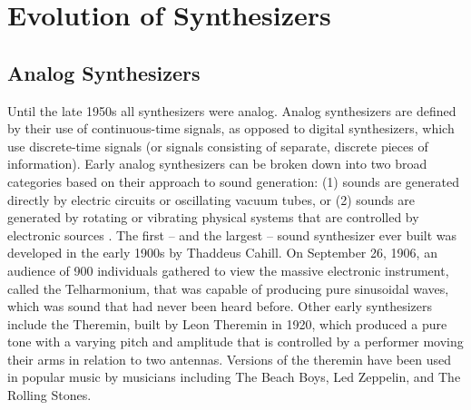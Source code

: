 \section{Evolution of Synthesizers}
\label{section:synth-history}
\subsection{Analog Synthesizers}
Until the late 1950s all synthesizers were analog. Analog synthesizers are defined by their use of continuous-time signals, as opposed to digital synthesizers, which use discrete-time signals (or signals consisting of separate, discrete pieces of information). Early analog synthesizers can be broken down into two broad categories based on their approach to sound generation: (1) sounds are generated directly by electric circuits or oscillating vacuum tubes, or (2) sounds are generated by rotating or vibrating physical systems that are controlled by electronic sources \cite{roads1996computer}. The first -- and the largest -- sound synthesizer ever built was developed in the early 1900s by Thaddeus Cahill. On September 26, 1906, an audience of 900 individuals gathered to view the massive electronic instrument, called the Telharmonium, that was capable of producing pure sinusoidal waves, which was sound that had never been heard before. Other early synthesizers include the Theremin, built by Leon Theremin in 1920, which produced a pure tone with a varying pitch and amplitude that is controlled by a performer moving their arms in relation to two antennas. Versions of the theremin have been used in popular music by musicians including The Beach Boys, Led Zeppelin, and The Rolling Stones. %

